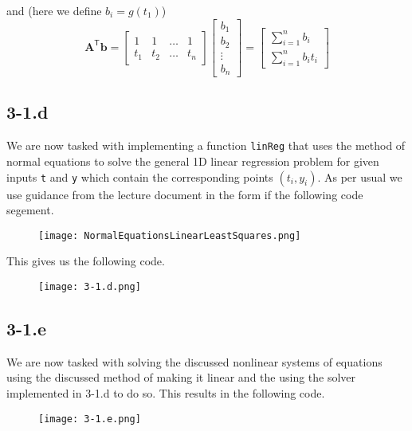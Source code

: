 \documentclass{article}
\begin{document}
and (here we define $b_{i} = g\left(t_{1}\right)$)
\begin{equation*}
    \mathbf{A}^{\mathsf{T}}\mathbf{b} = \begin{bmatrix}
    1 & 1 & \dots & 1 \\
    t_{1} & t_{2} & \dots & t_{n}
\end{bmatrix} 
\begin{bmatrix}
    b_{1} \\
    b_{2} \\
        \vdots \\
    b_{n}
\end{bmatrix}
= 
\begin{bmatrix}
    \sum_{i=1}^{n}b_{i} \\
    \sum_{i=1}^{n}b_{i}t_{i}
\end{bmatrix}
\end{equation*}
\subsection*{3-1.d} 
We are now tasked with implementing a function \verb|linReg| that uses the method of normal equations to solve the general 1D linear regression problem for given inputs \verb|t| and \verb|y| which contain the corresponding points $\left(t_{i}, y_{i}\right)$. As per usual we use guidance from the lecture document in the form if the following code segement.
\begin{figure}[!hbt]
    \centering
\texttt{[image: NormalEquationsLinearLeastSquares.png]}
\end{figure}

\pagebreak 

\noindent This gives us the following code.
\begin{figure}[!hbt]
    \centering
\texttt{[image: 3-1.d.png]}
\end{figure}

\subsection*{3-1.e}
We are now tasked with solving the discussed nonlinear systems of equations using the discussed method of making it linear and the using the solver implemented in 3-1.d to do so. This results in the following code.
\begin{figure}[!hbt]
    \centering
\texttt{[image: 3-1.e.png]}
\end{figure}
\end{document}
